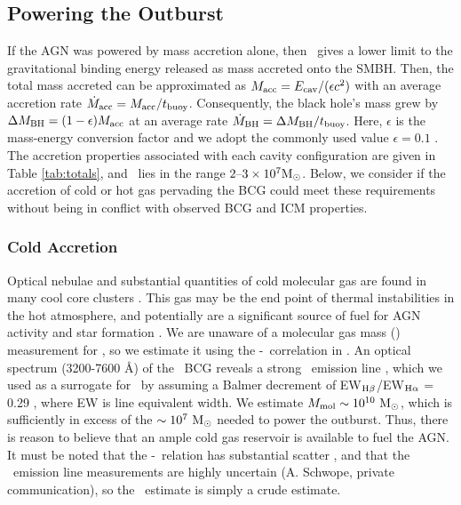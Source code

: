\documentclass[iop]{emulateapj}
\begin{document}
\subsection{Powering the Outburst}
\label{sec:accretion}

If the AGN was powered by mass accretion alone, then \ecav\ gives a
lower limit to the gravitational binding energy released as mass
accreted onto the SMBH. Then, the total mass accreted can be
approximated as $M_{\rm{acc}} = E_{\rm{cav}}/(\epsilon c^2)$ with an average
accretion rate $\dot{M}_{\rm{acc}} = M_{\rm{acc}}/t_{\rm{buoy}}$. Consequently, the black hole's
mass grew by $\Delta M_{\rm{BH}} = (1-\epsilon)M_{\rm{acc}}$ at an average rate $\dot{M}_{\rm{BH}} =
\Delta M_{\rm{BH}}/t_{\rm{buoy}}$. Here, $\epsilon$ is the mass-energy conversion factor
and we adopt the commonly used value $\epsilon = 0.1$
\citep{2002apa..book.....F}. The accretion properties associated with
each cavity configuration are given in Table \ref{tab:totals}, and
\macc\ lies in the range $2 \mbox{--} 3 \times 10^7 \rm{M_{\odot}}$. Below, we
consider if the accretion of cold or hot gas pervading the BCG could
meet these requirements without being in conflict with observed BCG
and ICM properties.

\subsubsection{Cold Accretion}
\label{sec:cold}

Optical nebulae and substantial quantities of cold molecular gas are
found in many cool core clusters \citep{crawford99, edge01}. This gas
may be the end point of thermal instabilities in the hot atmosphere,
and potentially are a significant source of fuel for AGN activity and
star formation \citep[\eg][]{pizzolato05, 2006NewA...12...38S,
  2010MNRAS.408..961P}. We are unaware of a molecular gas mass (\mmol)
measurement for \rbs, so we estimate it using the
\mmol-\halpha\ correlation in \citet{edge01}. An optical spectrum
(3200-7600 \AA) of the \rbs\ BCG reveals a strong \hbeta\ emission
line \citep{rbs1, rbs2}, which we used as a surrogate for \halpha\ by
assuming a Balmer decrement of EW$_{\rm{H}\beta}$/EW$_{\rm{H}\alpha}$ = 0.29
\citep{2006ApJ...642..775M}, where EW is line equivalent width. We
estimate $M_{\rm{mol}} \sim 10^{10} ~\rm{M_{\odot}}$, which is sufficiently in excess
of the $\sim 10^7 ~\rm{M_{\odot}}$ needed to power the outburst. Thus, there is
reason to believe that an ample cold gas reservoir is available to
fuel the AGN. It must be noted that the \mmol-\halpha\ relation has
substantial scatter \citep{salome03}, and that the \rbs\ emission line
measurements are highly uncertain (A. Schwope, private communication),
so the \mmol\ estimate is simply a crude estimate.
\end{document}
